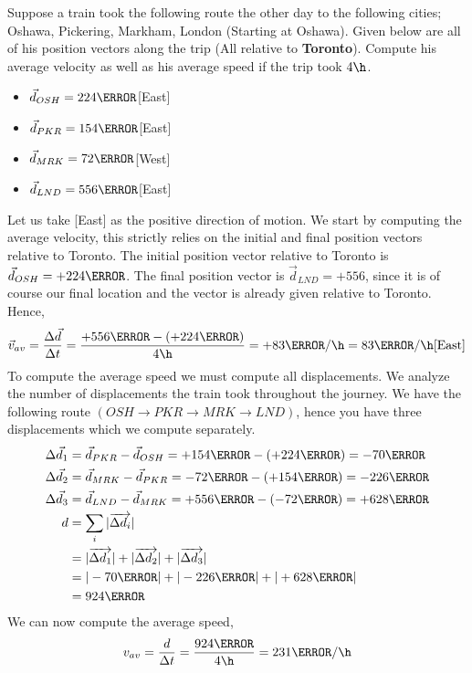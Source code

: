 \documentclass[12pt]{article} %
\newcommand{\tx}[1]{\text{#1}}
\begin{document}
\begin{qstn}[6]
	Suppose a train took the following route the other day to the following cities; Oshawa, Pickering, Markham, London (Starting at Oshawa). Given below are all of his position vectors along the trip (All relative to \textbf{Toronto}). Compute his average velocity as well as his average speed if the trip took $4 \h$.
	\begin{itemize}
	\item $\vec d_{OSH} = 224\km$[East]
	\item $\vec d_{PKR} = 154\km$[East]
	\item $\vec d_{MRK} = 72\km$[West]
	\item $\vec d_{LND} = 556\km$[East]
	\end{itemize}

	\begin{soln}
		Let us take [East] as the positive direction of motion. We start by computing the average velocity, this strictly relies on the initial and final position vectors relative to Toronto. The initial position vector relative to Toronto is $\vec d_{OSH} = +224\km$. The final position vector is $\vec d_{LND} = +556$, since it is of course our final location and the vector is already given relative to Toronto. Hence,
		$$\vec v_{av} = \frac{\Delta \vec d}{\Delta t} = \frac{+556 \km - (+224\km)}{4\h} = +83 \km / \h = 83 \km / \h \tx{[East]}$$
		To compute the average speed we must compute all displacements. We analyze the number of displacements the train took throughout the journey. We have the following route $(OSH \rightarrow PKR \rightarrow MRK \rightarrow LND)$, hence you have three displacements which we compute separately.
		\begin{align*}
			\Delta \vec d_1 &= \vec d_{PKR} - \vec d_{OSH} = +154\km - (+224\km) = -70\km\\
			\Delta \vec d_2 &= \vec d_{MRK} - \vec d_{PKR} = -72\km - (+154\km) = -226\km\\
			\Delta \vec d_3 &= \vec d_{LND} - \vec d_{MRK} = +556\km - (-72\km) = +628\km\\
			d &= \sum_i |\overrightarrow{\Delta d_i}|\\
			&= |\overrightarrow{\Delta d_1}| + |\overrightarrow{\Delta d_2}| + |\overrightarrow{\Delta d_3}|\\
			&= |-70 \km| + |-226\km| + |+628\km|\\
			&= 924\km
		\end{align*}
		We can now compute the average speed,
		$$v_{av} = \frac{d}{\Delta t} = \frac{924 \km}{4\h} = 231 \km / \h$$

	\end{soln}

\end{qstn}
\end{document}
